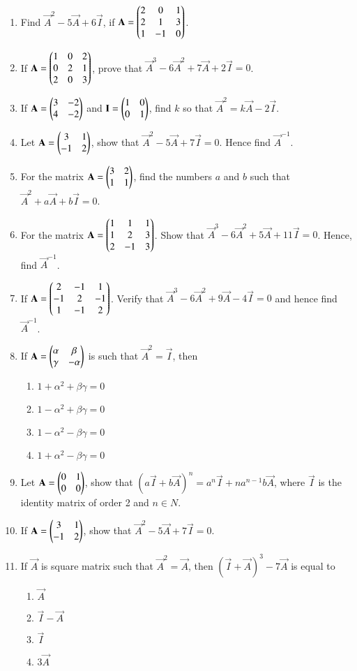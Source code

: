 \begin{enumerate}[label=\thesubsection.\arabic*,ref=\thesubsection.\theenumi]
\item Find $\vec{A}^2-5\vec{A}+6\vec{I}$, if $\mathbf{A}=\begin{pmatrix}
2 & 0 & 1 \\ 2 & 1 & 3 \\ 1 & -1 & 0\end{pmatrix}$.
\item If $\mathbf{A}=\begin{pmatrix}1 & 0 & 2 \\ 0 & 2 & 1 \\ 2 & 0 & 3\end{pmatrix}$, prove that $\vec{A}^3-6\vec{A}^2+7\vec{A}+2\vec{I}=0$.
\item If $\mathbf{A}=\begin{pmatrix}3 & -2 \\ 4 & -2\end{pmatrix}$ and $\mathbf{I}=\begin{pmatrix}1 & 0 \\ 0 & 1\end{pmatrix}$, find $k$ so that $\vec{A}^2=k\vec{A}-2\vec{I}$.
\item Let $\mathbf{A}=\begin{pmatrix}3 & 1 \\ -1 & 2\end{pmatrix}$, show that $\vec{A}^2-5\vec{A}+7\vec{I}=0$. Hence find $\vec{A}^{-1}$.
\item For the matrix $\mathbf{A}=\begin{pmatrix}3 & 2 \\ 1 & 1\end{pmatrix}$, find the numbers $a$ and $b$ such that $\vec{A}^2+a\vec{A}+b\vec{I}=0$.
\item For the matrix $\mathbf{A}=\begin{pmatrix}1 & 1 & 1 \\ 1 & 2 & 3 \\ 2 & -1 & 3\end{pmatrix}$. Show that $\vec{A}^3-6\vec{A}^2+5\vec{A}+11\vec{I}=0$. Hence, find $\vec{A}^{-1}$.
\item If $\mathbf{A}=\begin{pmatrix}2 & -1 & 1 \\ -1 & 2 & -1 \\ 1 & -1 & 2\end{pmatrix}$. Verify that $\vec{A}^3-6\vec{A}^2+9\vec{A}-4\vec{I}=0$ and hence find $\vec{A}^{-1}$.
\item If $\mathbf{A}=\begin{pmatrix}\alpha& \beta \\ \gamma& -\alpha\end{pmatrix}$ is such that $\vec{A}^2= \vec{I}$, then
\begin{enumerate} 
\item $1+ \alpha^2+ \beta \gamma=0$
\item $1-\alpha^2+ \beta \gamma=0$
\item $1-\alpha^2- \beta \gamma=0$
\item $1+\alpha^2- \beta \gamma=0$ 
\end{enumerate}
\item Let $\mathbf{A}=\begin{pmatrix}0 & 1\\ 0 & 0\end{pmatrix}$, show that $(a\vec{I}+b\vec{A})^n= a^n\vec{I}+na^{n-1} b\vec{A}$, where $\vec{I}$ is the identity matrix of order 2 and $n \in N$.
\item If $\mathbf{A}=\begin{pmatrix}3 & 1\\ -1 & 2\end{pmatrix}$, show that $\vec{A}^2-5\vec{A}+7\vec{I}=0$.
\item If $\vec{A}$ is square matrix such that $\vec{A}^2=\vec{A}$, then $(\vec{I}+\vec{A})^3-7\vec{A}$ is equal to
\begin{enumerate}
\item $\vec{A}$
\item $\vec{I}-\vec{A}$
\item $\vec{I}$
\item $3\vec{A}$
\end{enumerate}
\end{enumerate}
